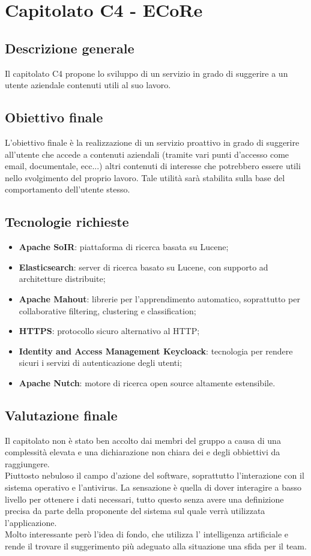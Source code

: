 \documentclass[StudioDiFattibilità.tex]{subfiles}
\begin{document}
\chapter{Capitolato C4 - ECoRe}
\section{Descrizione generale}
Il capitolato C4 propone lo sviluppo di un servizio in grado di suggerire a un utente aziendale contenuti utili al suo lavoro.
\section{Obiettivo finale}
L'obiettivo finale è la realizzazione di un servizio proattivo in grado di suggerire all'utente che accede a contenuti aziendali (tramite vari punti d'accesso come email, documentale, ecc...) altri contenuti di interesse che potrebbero essere utili nello svolgimento del proprio lavoro. Tale utilità sarà stabilita sulla base del comportamento dell'utente stesso.
\section{Tecnologie richieste}
\begin{itemize}
	\item \textbf{Apache SoIR}: piattaforma di ricerca basata su Lucene;
	\item \textbf{Elasticsearch}: server di ricerca basato su Lucene, con supporto ad architetture distribuite;
	\item \textbf{Apache Mahout}: librerie per l'apprendimento automatico, soprattutto per collaborative filtering, clustering e classification;
	\item \textbf{HTTPS}: protocollo sicuro alternativo al HTTP;
	\item \textbf{Identity and Access Management Keycloack}: tecnologia per rendere sicuri i servizi di autenticazione degli utenti;
	\item \textbf{Apache Nutch}: motore di ricerca open source altamente estensibile.
\end{itemize}
\section{Valutazione finale}
Il capitolato non è stato ben accolto dai membri del gruppo a causa di una complessità elevata e una dichiarazione non chiara dei  e degli obbiettivi da raggiungere.\\ Piuttosto nebuloso il campo d'azione del software, soprattutto l'interazione con il sistema operativo e l'antivirus. La sensazione è quella di dover interagire a basso livello per ottenere i dati necessari, tutto questo senza avere una definizione precisa da parte della proponente del sistema sul quale verrà utilizzata l'applicazione.\\
Molto interessante però l'idea di fondo, che utilizza l' intelligenza artificiale e rende il trovare il suggerimento più adeguato alla situazione una sfida per il team.
\end{document}
